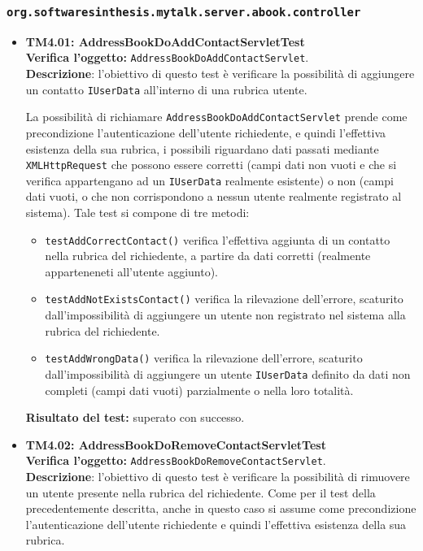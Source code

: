 \subsubsection{\texttt{org.softwaresinthesis.mytalk.server.abook.controller}}
\begin{itemize}

\item \textbf{TM4.01: AddressBookDoAddContactServletTest}\\

\textbf{Verifica l'oggetto:} \texttt{AddressBookDoAddContactServlet}.\\
\textbf{Descrizione}: l'obiettivo di questo test è verificare la possibilità di aggiungere un contatto \texttt{IUserData} all'interno di una rubrica utente.

La possibilità di richiamare \texttt{AddressBookDoAddContactServlet} prende come precondizione l'autenticazione dell'utente richiedente, e quindi l'effettiva esistenza della sua rubrica, i possibili  riguardano dati passati mediante \texttt{XMLHttpRequest} che possono essere corretti (campi dati non vuoti e che si verifica appartengano ad un \texttt{IUserData} realmente esistente) o non (campi dati vuoti, o che non corrispondono a nessun utente realmente registrato al sistema).
Tale test si compone di tre metodi:
\begin{itemize}
\item \texttt{testAddCorrectContact()} verifica l'effettiva aggiunta di un contatto nella rubrica del richiedente, a partire da dati corretti (realmente apparteneneti all'utente aggiunto).
\item \texttt{testAddNotExistsContact()} verifica la rilevazione dell'errore, scaturito dall'impossibilità di aggiungere un utente non registrato nel sistema alla rubrica del richiedente.
\item \texttt{testAddWrongData()} verifica la rilevazione dell'errore, scaturito dall'impossibilità di aggiungere un utente \texttt{IUserData} definito da dati non completi (campi dati vuoti) parzialmente o nella loro totalità.
\end{itemize}
\textbf{Risultato del test:} superato con successo.


\item \textbf{TM4.02: AddressBookDoRemoveContactServletTest}\\
\textbf{Verifica l'oggetto:} \texttt{AddressBookDoRemoveContactServlet}.\\
\textbf{Descrizione}: l'obiettivo di questo test è verificare la possibilità di rimuovere un utente presente nella rubrica del richiedente. Come per il test della  precedentemente descritta, anche in questo caso si assume come precondizione l'autenticazione dell'utente richiedente e quindi l'effettiva esistenza della sua rubrica.


\end{itemize}
